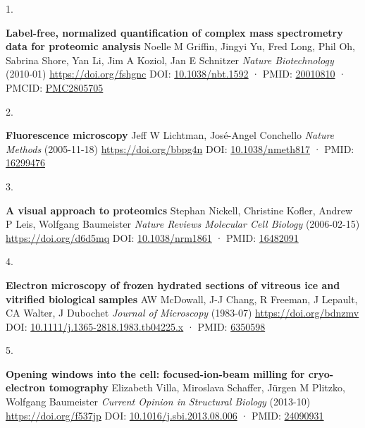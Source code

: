 \documentclass[
]{article}
\newlength{\cslhangindent}
\newlength{\csllabelwidth}
\newlength{\cslentryspacingunit} %
\newenvironment{CSLReferences}[2] %
 {%
  \setlength{\parindent}{0pt}
  \ifodd #1
  \let\oldpar\par
  \def\par{\hangindent=\cslhangindent\oldpar}
  \fi
  \setlength{\parskip}{#2\cslentryspacingunit}
 }%
 {}
\newcommand{\CSLBlock}[1]{#1\hfill\break}
\newcommand{\CSLLeftMargin}[1]{\parbox[t]{\csllabelwidth}{#1}}
\newcommand{\CSLRightInline}[1]{\parbox[t]{\linewidth - \csllabelwidth}{#1}\break}
\begin{document}
\hypertarget{refs}{}
\begin{CSLReferences}{0}{0}
\leavevmode{}%
\CSLLeftMargin{1. }
\CSLRightInline{\textbf{Label-free, normalized quantification of complex mass spectrometry data for proteomic analysis}
\CSLBlock{Noelle M Griffin, Jingyi Yu, Fred Long, Phil Oh, Sabrina Shore, Yan Li, Jim A Koziol, Jan E Schnitzer} \emph{Nature Biotechnology} (2010-01) \url{https://doi.org/fshgnc}
\CSLBlock{DOI: \href{https://doi.org/10.1038/nbt.1592}{10.1038/nbt.1592} · PMID: \href{https://www.ncbi.nlm.nih.gov/pubmed/20010810}{20010810} · PMCID: \href{https://www.ncbi.nlm.nih.gov/pmc/articles/PMC2805705}{PMC2805705}}}

\leavevmode{}%
\CSLLeftMargin{2. }
\CSLRightInline{\textbf{Fluorescence microscopy}
\CSLBlock{Jeff W Lichtman, José-Angel Conchello} \emph{Nature Methods} (2005-11-18) \url{https://doi.org/bbpg4n}
\CSLBlock{DOI: \href{https://doi.org/10.1038/nmeth817}{10.1038/nmeth817} · PMID: \href{https://www.ncbi.nlm.nih.gov/pubmed/16299476}{16299476}}}

\leavevmode{}%
\CSLLeftMargin{3. }
\CSLRightInline{\textbf{A visual approach to proteomics}
\CSLBlock{Stephan Nickell, Christine Kofler, Andrew P Leis, Wolfgang Baumeister} \emph{Nature Reviews Molecular Cell Biology} (2006-02-15) \url{https://doi.org/d6d5mq}
\CSLBlock{DOI: \href{https://doi.org/10.1038/nrm1861}{10.1038/nrm1861} · PMID: \href{https://www.ncbi.nlm.nih.gov/pubmed/16482091}{16482091}}}

\leavevmode{}%
\CSLLeftMargin{4. }
\CSLRightInline{\textbf{Electron microscopy of frozen hydrated sections of vitreous ice and vitrified biological samples}
\CSLBlock{AW McDowall, J-J Chang, R Freeman, J Lepault, CA Walter, J Dubochet} \emph{Journal of Microscopy} (1983-07) \url{https://doi.org/bdnzmv}
\CSLBlock{DOI: \href{https://doi.org/10.1111/j.1365-2818.1983.tb04225.x}{10.1111/j.1365-2818.1983.tb04225.x} · PMID: \href{https://www.ncbi.nlm.nih.gov/pubmed/6350598}{6350598}}}

\leavevmode{}%
\CSLLeftMargin{5. }
\CSLRightInline{\textbf{Opening windows into the cell: focused-ion-beam milling for cryo-electron tomography}
\CSLBlock{Elizabeth Villa, Miroslava Schaffer, Jürgen M Plitzko, Wolfgang Baumeister} \emph{Current Opinion in Structural Biology} (2013-10) \url{https://doi.org/f537jp}
\CSLBlock{DOI: \href{https://doi.org/10.1016/j.sbi.2013.08.006}{10.1016/j.sbi.2013.08.006} · PMID: \href{https://www.ncbi.nlm.nih.gov/pubmed/24090931}{24090931}}}


\end{CSLReferences}
\end{document}
